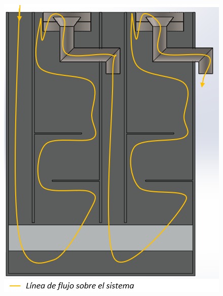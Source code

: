 \begin{figure}[h!]
\centering
\begin{minipage}[b]{0.48\textwidth}
	\includegraphics[width=\textwidth]{Images/Elution/flujo.PNG}
\end{minipage}
\hfill
\begin{minipage}[b]{0.48\textwidth}

\end{minipage}
\end{figure}
